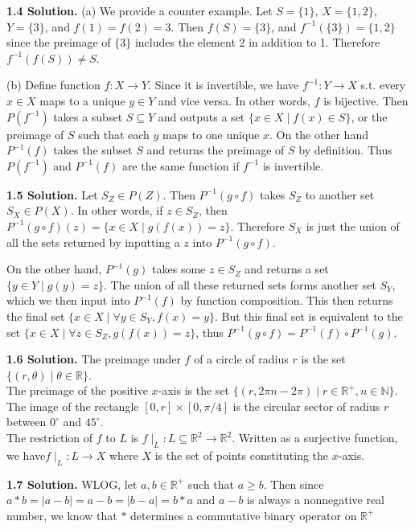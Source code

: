 \textbf{1.4 Solution.} (a)  We provide a counter example. Let $S=\{1\}$, $X=\{1, 2\}$, $Y=\{3\}$, and $f(1)=f(2)=3$. Then $f(S)=\{3\}$, and $f^{-1}(\{3\})=\{1, 2\}$ since the preimage of $\{3\}$ includes the element 2 in addition to 1. Therefore $f^{-1}(f(S))\neq S$.

(b)  Define function $f:X\to Y$. Since it is invertible, we have $f^{-1}:Y\to X$ s.t. every $x\in X$ maps to a unique $y\in Y$ and vice versa. In other words, $f$ is bijective. Then $P(f^{-1})$ takes a subset $S\subseteq Y$ and outputs a set $\{x\in X\mid f(x)\in S\}$, or the preimage of $S$ such that each $y$ maps to one unique $x$. On the other hand $P^{-1}(f)$ takes the subset $S$ and returns the preimage of $S$ by definition. Thus $P(f^{-1})$ and $P^{-1}(f)$ are the same function if $f^{-1}$ is invertible.

\textbf{1.5 Solution.} Let $S_Z\in P(Z)$. Then $P^{-1}(g\circ f)$ takes $S_Z$ to another set $S_X\in P(X)$. In other words, if $z\in S_Z$, then $P^{-1}(g\circ f)(z)=\{x\in X\mid g(f(x))=z\}$. Therefore $S_X$ is just the union of all the sets returned by inputting a $z$ into $P^{-1}(g\circ f)$.

On the other hand, $P^{-1}(g)$ takes some $z\in S_Z$ and returns a set $\{y\in Y\mid g(y)=z\}$. The union of all these returned sets forms another set $S_Y$, which we then input into $P^{-1}(f)$ by function composition. This then returns the final set $\{x\in X\mid \forall y\in S_Y, f(x)=y\}$. But this final set is equivalent to the set $\{x\in X\mid \forall z\in S_Z, g(f(x))=z\}$, thus $P^{-1}(g\circ f)=P^{-1}(f)\circ P^{-1}(g)$.

\textbf{1.6 Solution.} The preimage under $f$ of a circle of radius $r$ is the set $\{(r,\theta)\mid \theta\in\mathbb{R}\}$. \\
The preimage of the positive $x$-axis is the set $\{(r,2\pi n-2\pi)\mid r\in\mathbb{R}^+, n\in\mathbb{N}\}$. \\
The image of the rectangle $[0,r]\times[0,\pi/4]$ is the circular sector of radius $r$ between $0^{\circ}$ and $45^{\circ}$. \\
The restriction of $f$ to $L$ is $f\mid_L:L\subseteq\mathbb{R}^2\to \mathbb{R}^2$. Written as a surjective function, we have$f\mid_L:L\to X$ where $X$ is the set of points constituting the $x$-axis.

\textbf{1.7 Solution.} WLOG, let $a,b\in \mathbb{R}^+$ such that $a\geq b$. Then since $a*b=|a-b|=a-b=|b-a|=b*a$ and $a-b$ is always a nonnegative real number, we know that $*$ determines a commutative binary operator on $\mathbb{R}^+$

